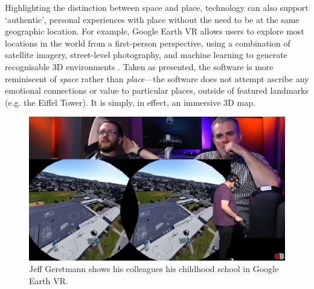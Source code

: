 Highlighting the distinction between space and place, technology can also support `authentic', personal experiences with place without the need to be at the same geographic location. For example, Google Earth VR allows users to explore most locations in the world from a first-person perspective, using a combination of satellite imagery, street-level photography, and machine learning to generate recognisable 3D environments \citep{Google}. Taken as presented, the software is more reminiscent of \textit{space} rather than \textit{place}---the software does not attempt ascribe any emotional connections or value to particular places, outside of featured landmarks (e.g. the Eiffel Tower). It is simply, in effect, an immersive 3D map. 

\begin{figure}
  \centering
  \includegraphics[width=0.8\columnwidth]{images/chapter02/googleEarth.PNG}
  \caption[Jeff Gerstmann showing Google Earth VR]{Jeff Gerstmann shows his colleagues his childhood school in Google Earth VR.}
  \label{fig:googleEarth}
\end{figure}

